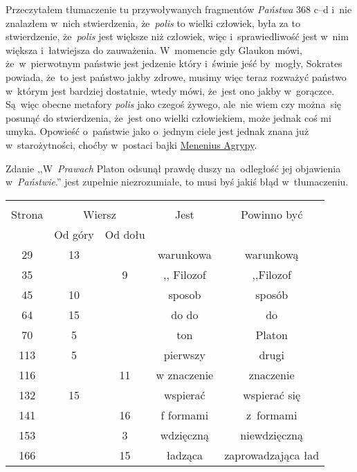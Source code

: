 \documentclass[a4paper,11pt]{article}
\begin{document}
\start {} Przeczytałem tłumaczenie tu przywoływanych fragmentów
\emph{Państwa} 368 c--d i~nie znalazłem w~nich stwierdzenia,
że~\emph{polis} to wielki człowiek, była za to stwierdzenie,
że~\emph{polis} jest większe niż człowiek, więc i~sprawiedliwość jest
w~nim większa i~łatwiejsza do zauważenia. W~momencie gdy Glaukon mówi,
że~w~pierwotnym państwie jest jedzenie który i~świnie jeść by~mogły,
Sokrates powiada, że~to jest państwo jakby zdrowe, musimy więc teraz
rozważyć państwo w~którym jest bardziej dostatnie, wtedy mówi, że~jest
ono jakby w~gorączce. Są~więc obecne metafory \emph{polis} jako czegoś
żywego, ale~nie wiem czy można~się posunąć do stwierdzenia, że~jest
ono wielki człowiekiem, może jednak coś mi umyka. Opowieść o~państwie
jako o~jednym ciele jest jednak znana już w~starożytności, choćby
w~postaci bajki
\href{https://en.wikipedia.org/wiki/Agrippa_Menenius_Lanatus_(consul_503_BC)}
{Menenius Agrypy}.

\vspace{\spaceFour}


\start {} Zdanie ,,W~\emph{Prawach} Platon odsunął prawdę
duszy na~odległość jej objawienia w~\emph{Państwie}.'' jest zupełnie
niezrozumiałe, to musi byś jakiś błąd w~tłumaczeniu.



\begin{center}
  \begin{tabular}{|c|c|c|c|c|}
    \hline
    & \multicolumn{2}{c|}{} & & \\
    Strona & \multicolumn{2}{c|}{Wiersz}& Jest & Powinno być \\ \cline{2-3}
    & Od góry & Od dołu &  &  \\ \hline
    29 & 13 & & warunkowa & warunkową \\
    35 & & 9 & ,, Filozof %
           & ,,Filozof \\ %
    45 & 10 & & sposob & sposób \\
    64 & 15 & & do do & do \\
    70 & 5 & & ton & Platon \\
    113 & 5 & & pierwszy & drugi \\
    116 & & 11 & w znaczenie & znaczenie \\
    132 & 15 & & wspierać & wspierać się \\
    141 & & 16 & f formami & z~formami \\
    153 & & 3 & wdzięczną & niewdzięczną \\
    166 & & 15 & ładząca & zaprowadzająca ład \\
    \hline
  \end{tabular}
\end{center}
\end{document}
